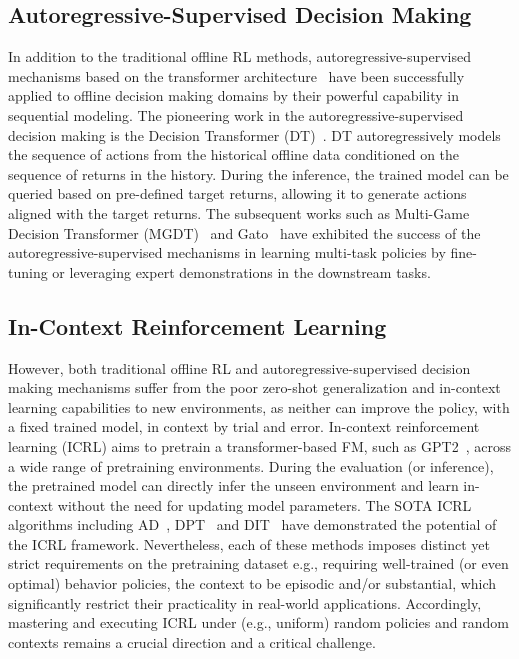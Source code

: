 \documentclass[10pt]{article}
\begin{document}
\subsection{Autoregressive-Supervised Decision Making}
In addition to the traditional offline RL methods, autoregressive-supervised mechanisms based on the transformer architecture~\citep{vaswani2017attention} have been successfully applied to offline decision making domains by their powerful capability in sequential modeling.
The pioneering work in the autoregressive-supervised decision making is the Decision Transformer (DT)~\citep{chen2021decision}.
DT autoregressively models the sequence of actions from the historical offline data conditioned on the sequence of returns in the history.
During the inference, the trained model can be queried based on pre-defined target returns, allowing it to generate actions aligned with the target returns.
The subsequent works such as Multi-Game Decision Transformer (MGDT)~\citep{lee2022multi} and Gato~\citep{reed2022generalist} have exhibited the success of the autoregressive-supervised mechanisms in learning multi-task policies by fine-tuning or leveraging expert demonstrations in the downstream tasks.
\subsection{In-Context Reinforcement Learning}
However, both traditional offline RL and autoregressive-supervised decision making mechanisms suffer from the poor zero-shot generalization and in-context learning capabilities to new environments, as neither can improve the policy, with a fixed trained model, in context by trial and error. In-context reinforcement learning (ICRL) aims to pretrain a transformer-based FM, such as GPT2~\citep{radford2019language}, across a wide range of pretraining environments. During the evaluation (or inference), the pretrained model can directly infer the unseen environment and learn in-context without the need for updating model parameters.
The SOTA ICRL algorithms including AD~\citep{laskin2022context}, DPT~\citep{lee2024supervised} and DIT~\citep{dong2024context} have demonstrated the potential of the ICRL framework. Nevertheless, each of these methods imposes distinct yet strict requirements on the pretraining dataset e.g., requiring well-trained (or even optimal) behavior policies, the context to be episodic and/or substantial, which significantly restrict their practicality in real-world applications.
Accordingly, mastering and executing ICRL under (e.g., uniform) random policies and random contexts remains a crucial direction and a critical challenge.
\end{document}
